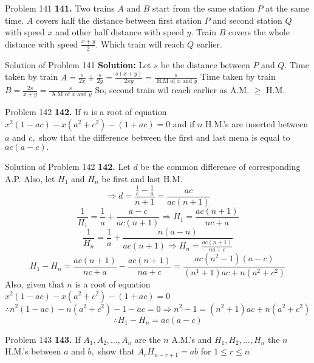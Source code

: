 \documentclass[aspectratio=1610,8pt]{beamer}
\begin{document}
\begin{frame}{Problem 141}
  \textbf{141.} Two trains $A$ and $B$ start from the same station $P$ at the same time. $A$ covers half the distance between first
  station $P$ and second station $Q$ with speed $x$ and other half distance with speed $y$. Train $B$ covers the whole distance
  with speed $\frac{x + y}{2}.$ Which train will reach $Q$ earlier.
\end{frame}
\begin{frame}{Solution of Problem 141}
  \textbf{Solution:} Let $s$ be the distance between $P$ and $Q.$
  \linebreak\linebreak
  Time taken by train $A = \frac{s}{2x} + \frac{s}{2y} = \frac{s(x + y)}{2xy} = \frac{s}{\text{~H.M of~}x \text{~and~}y}$
  \linebreak\linebreak
  Time taken by train $B = \frac{2s}{x + y} = \frac{s}{\text{~A.M of~}x \text{~and~}y}$
  \linebreak\linebreak
  So, second train wil reach earlier as A.M. $\geq$ H.M.
\end{frame}
\begin{frame}{Problem 142}
  \textbf{142.} If $n$ is a root of equation $x^2(1 - ac) - x(a^2+c^2) - (1 + ac) = 0$ and if $n$ H.M.'s are inserted between $a$
  and $c,$ show that the difference between the first and last mena is equal to $ac(a - c).$
\end{frame}
\begin{frame}{Solution of Problem 142}
  \textbf{142.} Let $d$ be the common difference of corresponding A.P. Also, let $H_1$ and $H_n$ be first and last H.M.
   $$\Rightarrow d = \frac{\frac{1}{c} - \frac{1}{a}}{n + 1} = \frac{ac}{ac(n + 1)}$$
  $$\frac{1}{H_1} = \frac{1}{a} + \frac{a - c}{ac(n + 1)} \Rightarrow H_1 = \frac{ac(n + 1)}{nc + a}$$
  $$\frac{1}{H_n} = \frac{1}{a} + \frac{n(a - n)}{ac(n + 1) \Rightarrow H_n = \frac{ac(n + 1)}{na + c}}$$
  $$H_1 - H_n = \frac{ac(n + 1)}{nc + a} - \frac{ac(n + 1)}{na + c} = \frac{ac(n^2 - 1)(a - c)}{(n^1 + 1)ac + n(a^2 + c^2)}$$
  Also, given that $n$ is a root of equation $x^2(1 - ac) - x(a^2+c^2) - (1 + ac) = 0$
  $$\therefore n^2(1 - ac) - n(a^2 + c^2) - 1 - ac = 0 \Rightarrow n^2 - 1 = (n^2 + 1)ac + n(a^2 + c^2)$$
  $$\therefore H_1 - H_n = ac(a - c)$$
\end{frame}
\begin{frame}{Problem 143}
  \textbf{143.} If $A_1, A_2, \ldots, A_n$ are the $n$ A.M.'s and $H_1, H_2, \ldots, H_n$ the $n$ H.M.'s between $a$ and $b,$ show
  that $A_rH_{n - r + 1} = ab$ for $1\leq r\leq n$
\end{frame}
\end{document}
